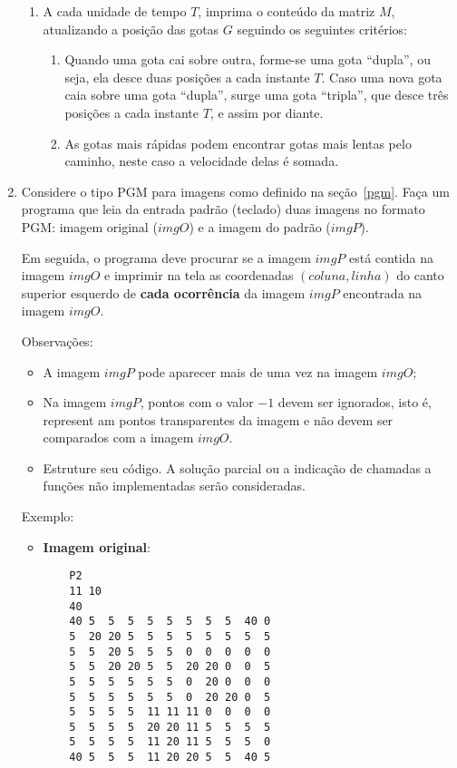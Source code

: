 \begin{enumerate}
\begin {enumerate}
\item
A cada unidade de tempo $T$, imprima o conteúdo da matriz $M$,
atualizando a posição das gotas $G$ seguindo os seguintes critérios:

        \begin{enumerate}
        \item
        Quando uma gota cai sobre outra, forme-se uma gota ``dupla'', ou seja, ela desce
        duas posições a cada instante $T$. Caso uma nova gota caia sobre uma gota
        ``dupla'', surge uma gota ``tripla'', que desce três posições a cada instante
        $T$, e assim por diante. 
        
        \item
        As gotas mais rápidas podem encontrar gotas mais lentas pelo caminho, neste caso
        a velocidade delas é somada.
        \end{enumerate}

\end{enumerate}



\item Considere o tipo PGM para imagens como definido na seção~\ref{pgm}.
Faça um programa que leia da entrada padrão 
(teclado) duas imagens no formato PGM: imagem original ($imgO$) e a imagem 
do padrão ($imgP$).
 
Em seguida, o programa deve procurar se a imagem $imgP$ está contida na 
imagem $imgO$ e imprimir na tela as coordenadas $(coluna,linha)$ do canto 
superior esquerdo de \textbf{cada ocorrência} da imagem $imgP$ encontrada na 
imagem $imgO$.

Observações:
\begin{itemize}
    \item A imagem $imgP$ pode aparecer mais de uma vez na imagem $imgO$;
    \item Na imagem $imgP$, pontos com o valor $-1$ devem ser ignorados, isto é, represent
am pontos transparentes da imagem e não devem ser comparados com a imagem $imgO$.
    \item Estruture seu código. A solução parcial ou a indicação de chamadas a funções não
 implementadas serão consideradas.
\end{itemize}

Exemplo:
\begin{itemize}
\vspace*{-2mm}      
    \item \textbf{Imagem original}:
    \begin{verbatim}
    P2
    11 10
    40
    40 5  5  5  5  5  5  5  5  40 0 
    5  20 20 5  5  5  5  5  5  5  5
    5  5  20 5  5  5  0  0  0  0  0
    5  5  20 20 5  5  20 20 0  0  5
    5  5  5  5  5  5  0  20 0  0  0
    5  5  5  5  5  5  0  20 20 0  5
    5  5  5  5  11 11 11 0  0  0  0
    5  5  5  5  20 20 11 5  5  5  5
    5  5  5  5  11 20 11 5  5  5  0
    40 5  5  5  11 20 20 5  5  40 5
    \end{verbatim}


\end{itemize}
\end{enumerate}
